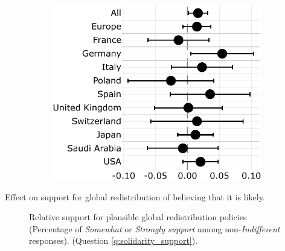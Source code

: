 \documentclass[12pt,english]{article}
\begin{document}
\begin{bibunit}
\begin{figure}
\begin{subfigure}{.49\textwidth}
  \includegraphics[height=.36\textheight]{../figures/country_comparison/share_solidarity_supported_by_info_solidarity.pdf}
\end{subfigure}
\end{figure}
\begin{table}[!htbp] 
  \caption{Effect on support for global redistribution of believing that it is likely.}\label{tab:iv} 
  \makebox[\textwidth][c]{}
\end{table}
\begin{figure}[h!]
    \caption[Relative support for plausible global redistribution policies]{Relative support for plausible global redistribution policies (Percentage of \textit{Somewhat} or \textit{Strongly support} among non-\textit{Indifferent} responses). (Question \ref{q:solidarity_support}).
    }\label{fig:solidarity_support_share}

\end{figure}
\end{bibunit}
\end{document}
